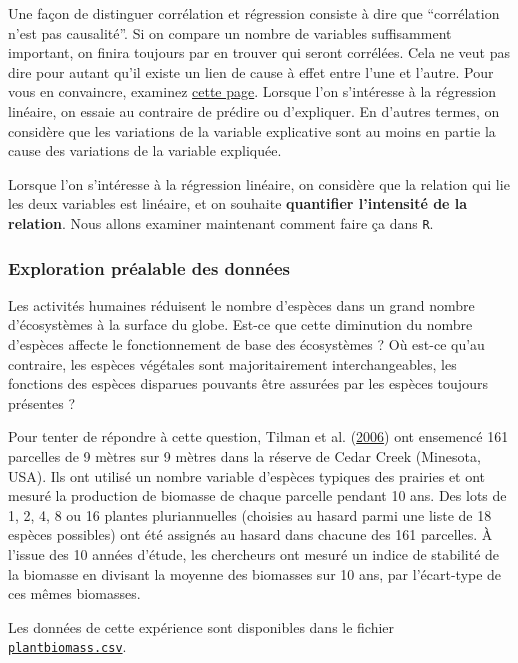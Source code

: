 \documentclass[a4paperpaper,]{article}
\begin{document}
Une façon de distinguer corrélation et régression consiste à dire que ``corrélation n'est pas causalité''. Si on compare un nombre de variables suffisamment important, on finira toujours par en trouver qui seront corrélées. Cela ne veut pas dire pour autant qu'il existe un lien de cause à effet entre l'une et l'autre. Pour vous en convaincre, examinez \href{http://www.tylervigen.com/spurious-correlations}{cette page}. Lorsque l'on s'intéresse à la régression linéaire, on essaie au contraire de prédire ou d'expliquer. En d'autres termes, on considère que les variations de la variable explicative sont au moins en partie la cause des variations de la variable expliquée.

Lorsque l'on s'intéresse à la régression linéaire, on considère que la relation qui lie les deux variables est linéaire, et on souhaite \textbf{quantifier l'intensité de la relation}. Nous allons examiner maintenant comment faire ça dans \texttt{R}.

\hypertarget{exploration-pruxe9alable-des-donnuxe9es-3}{%
\subsubsection{Exploration préalable des données}\label{exploration-pruxe9alable-des-donnuxe9es-3}}

Les activités humaines réduisent le nombre d'espèces dans un grand nombre d'écosystèmes à la surface du globe. Est-ce que cette diminution du nombre d'espèces affecte le fonctionnement de base des écosystèmes ? Où est-ce qu'au contraire, les espèces végétales sont majoritairement interchangeables, les fonctions des espèces disparues pouvants être assurées par les espèces toujours présentes ?

Pour tenter de répondre à cette question, Tilman et al. (\protect\hyperlink{ref-tilman2006}{2006}) ont ensemencé 161 parcelles de 9 mètres sur 9 mètres dans la réserve de Cedar Creek (Minesota, USA). Ils ont utilisé un nombre variable d'espèces typiques des prairies et ont mesuré la production de biomasse de chaque parcelle pendant 10 ans. Des lots de 1, 2, 4, 8 ou 16 plantes pluriannuelles (choisies au hasard parmi une liste de 18 espèces possibles) ont été assignés au hasard dans chacune des 161 parcelles. À l'issue des 10 années d'étude, les chercheurs ont mesuré un indice de stabilité de la biomasse en divisant la moyenne des biomasses sur 10 ans, par l'écart-type de ces mêmes biomasses.

Les données de cette expérience sont disponibles dans le fichier \href{https://besibo.github.io/Biometrie3/data/plantbiomass.csv}{\texttt{plantbiomass.csv}}.
\end{document}

